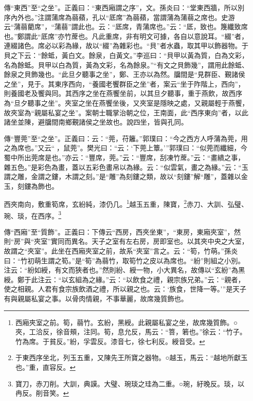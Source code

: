 {\noindent\zhuan{}\fzbyks 傳“東西”至“之坐”。正義曰：“東西廂謂之序”，文。孫炎曰：“堂東西牆，所以別序內外也。”注謂蒲席為蒻蘋，孔以“厎席”為蒻蘋，當謂蒲為蒲蒻之席也。史游云“蒲蒻藺席”，“蒲蒻”謂此也。云：“厎席，青蒲席也。”云：“厎，致也。篾纖致席也。”鄭謂此“厎席”亦竹蓆也。凡此重席，非有明文可據，各自以意說耳。“綴”者，連綴諸色。席必以彩為緣，故以“綴”為雜彩也。“貝”者水蟲，取其甲以飾器物。于貝之下云：“餘蚳，黃白文。餘泉，白黃文。”李巡曰：“貝甲以黃為質，白為文彩，名為餘蚳。貝甲以白為質，黃為文彩，名為餘泉。”“有文之貝飾幾”，謂用此餘蚳、餘泉之貝飾幾也。“此旦夕聽事之坐”，鄭、王亦以為然。牖間是“見群臣、覲諸侯之坐”，見于。其東序西向，“養國老饗群臣之坐”者，案云“坐于阼階上，西向”，則養國老及饗與同。其西序之坐在燕饗坐前，以其旦夕聽事，重于燕飲，故西序為“旦夕聽事之坐”。夾室之坐在燕饗坐後，又夾室是隱映之處，又親屬輕于燕饗，故夾室為“親屬私宴之坐”。案朝士職掌治朝之位，王南面，此“西序東向”者，以此諸坐並陳，避牖間南鄉覲諸侯之坐故也。說四坐，皆與孔同。 \par}

{\noindent\zhuan{}\fzbyks 傳“豐莞”至“之坐”。正義曰：云：“莞，苻籬。”郭璞曰：“今之西方人呼蒲為莞，用之為席也。”又云“𦸣，鼠莞”。樊光曰：“云：‘下莞上簟。’”郭璞曰：“似莞而纖細，今蜀中所出莞席是也。”亦云：“豐席，莞。”云：“豐席，刮凍竹蓆。”云：“畫繢之事，雜五色。”是彩色為畫，蓋以五彩色畫帛以為緣。云：“似雲氣，畫之為緣。”云：“玉謂之雕，金謂之鏤，木謂之刻。”是“雕”為刻鏤之類，故以“刻鏤”解“雕”，蓋雜以金玉，刻鏤為飾也。 \par}

西夾南向，敷重筍席，玄紛純，漆仍几。\footnote{西廂夾室之前。筍，蒻竹。玄紛，黑綬。此親屬私宴之坐，故席幾質飾。○夾，工洽反，徐音頰，注同。筍，息允反，馬云：“箁，箬也。”徐云：“竹子。竹為席。于貧反。”紛，孚雲反。漆音七，徐七利反。綬音受。}越玉五重，陳寶，\footnote{于東西序坐北，列玉五重，又陳先王所寶之器物。○越玉，馬云：“越地所獻玉也。”重，直容反。}赤刀、大訓、弘璧、琬、琰，在西序。\footnote{寶刀，赤刀削。大訓，典謨。大璧、琬琰之珪為二重。○琬，紆晚反。琰，以冉反。削音笑。}


{\noindent\zhuan{}\fzbyks 傳“西廂”至“質飾”。正義曰：下傳云“西房，西夾坐東”，“東房，東廂夾室”，然則“房”與“夾室”實同而異名。天子之室有左右房，房即室也。以其夾中央之大室，故謂之“夾室”。此坐在西廂夾室之前，故系“夾室”言之。云：“筍，竹萌。”孫炎曰：“竹初萌生謂之筍。”是“筍”為蒻竹，取筍竹之皮以為席也。“紛”則組之小別。注云：“紛如綬，有文而狹者也。”然則紛、綬一物，小大異名，故傳以“玄紛”為黑綬。鄭于此注云：“以玄組為之緣。”云：“以飲食之禮，親宗族兄弟。”云：“親者，使之相親。人君有食宗族飲酒之禮，所以親之也。云：‘族食，世降一等。’”是天子有與親屬私宴之事。以骨肉情親，不事華麗，故席幾質飾也。 \par}

